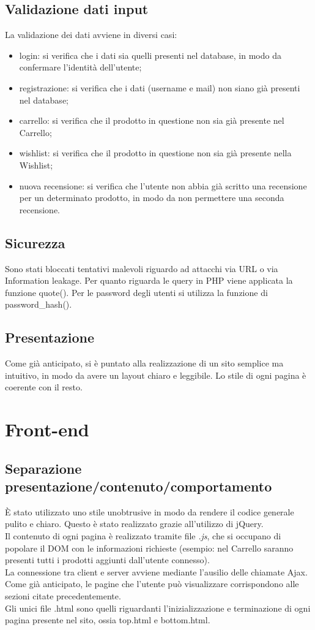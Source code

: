 \documentclass[14pt]{extarticle}
\begin{document}
\subsection{Validazione dati input}
La validazione dei dati avviene in diversi casi:
\begin{itemize}
    \item login: si verifica che i dati sia quelli presenti nel database, in modo da confermare l'identità dell'utente; 
    \item registrazione: si verifica che i dati (username e mail) non siano già presenti nel database;
    \item carrello: si verifica che il prodotto in questione non sia già presente nel Carrello;
    \item wishlist: si verifica che il prodotto in questione non sia già presente nella Wishlist;
    \item nuova recensione: si verifica che l'utente non abbia già scritto una recensione per un determinato prodotto, in modo da non permettere una seconda recensione.
\end{itemize}

\subsection{Sicurezza}
Sono stati bloccati tentativi malevoli riguardo ad attacchi via URL o via Information leakage.
Per quanto riguarda le query in PHP viene applicata la funzione quote(). Per le password degli
utenti si utilizza la funzione di password\_hash().

\subsection{Presentazione}
Come già anticipato, si è puntato alla realizzazione di un sito semplice ma intuitivo, in modo da
avere un layout chiaro e leggibile. Lo stile di ogni pagina è coerente con il resto.


\section{Front-end}
\subsection{Separazione presentazione/contenuto/comportamento}
È stato utilizzato uno stile unobtrusive in modo da rendere il codice generale pulito e chiaro.
Questo è stato realizzato grazie all'utilizzo di jQuery.
\\
Il contenuto di ogni pagina è realizzato tramite file \textit{.js}, che si occupano di popolare il DOM con le
informazioni richieste (esempio: nel Carrello saranno presenti tutti i prodotti aggiunti dall'utente
connesso).
\\
La connessione tra client e server avviene mediante l'ausilio delle chiamate Ajax.
Come già anticipato, le pagine che l’utente può visualizzare corrispondono alle sezioni citate
precedentemente.
\\
Gli unici file .html sono quelli riguardanti l'inizializzazione e terminazione di ogni pagina presente
nel sito, ossia top.html e bottom.html.
\end{document}
